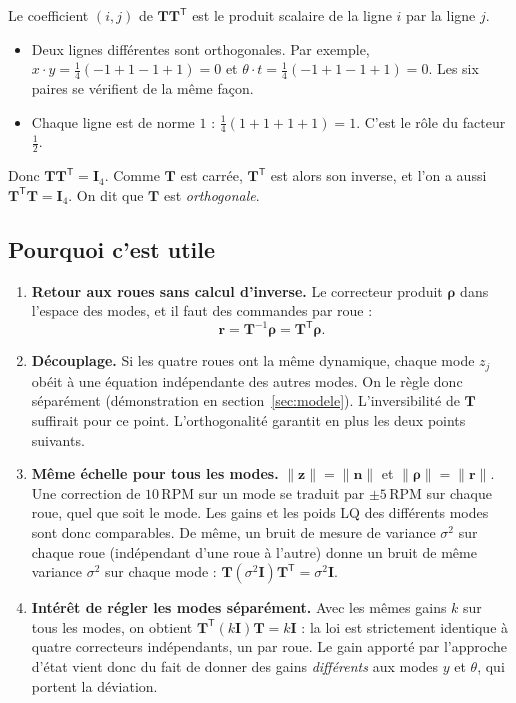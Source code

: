 \documentclass[11pt,a4paper]{article}
\newcommand{\SI}[2]{\ensuremath{#1\,\mathrm{#2}}}
\newcommand{\vect}[1]{\boldsymbol{#1}}
\newcommand{\T}{\mathsf{T}}
\newcommand{\Tm}{\vect{T}}
\begin{document}
Le coefficient $(i,j)$ de $\Tm\Tm^\T$ est le produit scalaire de la ligne $i$ par la ligne $j$.
\begin{itemize}
\item Deux lignes différentes sont orthogonales. Par exemple, $x\cdot y=\tfrac14(-1+1-1+1)=0$ et $\theta\cdot t=\tfrac14(-1+1-1+1)=0$. Les six paires se vérifient de la même façon.
\item Chaque ligne est de norme $1$ : $\tfrac14(1+1+1+1)=1$. C'est le rôle du facteur $\tfrac12$.
\end{itemize}
Donc $\Tm\Tm^\T=\vect I_4$.
Comme $\Tm$ est carrée, $\Tm^\T$ est alors son inverse, et l'on a aussi $\Tm^\T\Tm=\vect I_4$.
On dit que $\Tm$ est \emph{orthogonale}.

\subsection{Pourquoi c'est utile}\label{sec:T-utile}

\begin{enumerate}
\item \textbf{Retour aux roues sans calcul d'inverse.}
Le correcteur produit $\vect\rho$ dans l'espace des modes, et il faut des commandes par roue :
\begin{equation}
\vect r=\Tm^{-1}\vect\rho=\Tm^\T\vect\rho .
\end{equation}

\item \textbf{Découplage.}
Si les quatre roues ont la même dynamique, chaque mode $z_j$ obéit à une équation indépendante des autres modes.
On le règle donc séparément (démonstration en section~\ref{sec:modele}).
L'inversibilité de $\Tm$ suffirait pour ce point. L'orthogonalité garantit en plus les deux points suivants.

\item \textbf{Même échelle pour tous les modes.}
$\|\vect z\|=\|\vect n\|$ et $\|\vect\rho\|=\|\vect r\|$.
Une correction de \SI{10}{RPM} sur un mode se traduit par $\pm\SI{5}{RPM}$ sur chaque roue, quel que soit le mode.
Les gains et les poids LQ des différents modes sont donc comparables.
De même, un bruit de mesure de variance $\sigma^2$ sur chaque roue (indépendant d'une roue à l'autre) donne un bruit de même variance $\sigma^2$ sur chaque mode : $\Tm(\sigma^2\vect I)\Tm^\T=\sigma^2\vect I$.

\item \textbf{Intérêt de régler les modes séparément.}
Avec les mêmes gains $k$ sur tous les modes, on obtient $\Tm^\T(k\vect I)\Tm=k\vect I$ :
la loi est strictement identique à quatre correcteurs indépendants, un par roue.
Le gain apporté par l'approche d'état vient donc du fait de donner des gains \emph{différents} aux modes $y$ et $\theta$, qui portent la déviation.
\end{enumerate}
\end{document}
